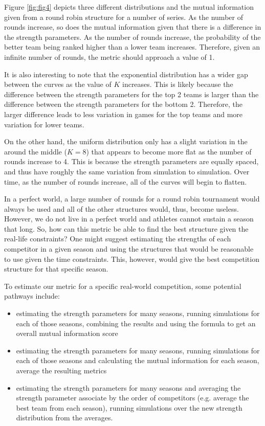 \documentclass[
  12pt,
]{article}
\begin{document}
Figure \ref{fig:fig4} depicts three different distributions and the
mutual information given from a round robin structure for a number of
series. As the number of rounds increase, so does the mutual information
given that there is a difference in the strength parameters. As the
number of rounds increase, the probability of the better team being
ranked higher than a lower team increases. Therefore, given an infinite
number of rounds, the metric should approach a value of 1.

It is also interesting to note that the exponential distribution has a
wider gap between the curves as the value of \(K\) increases. This is
likely because the difference between the strength parameters for the
top 2 teams is larger than the difference between the strength
parameters for the bottom 2. Therefore, the larger difference leads to
less variation in games for the top teams and more variation for lower
teams.

On the other hand, the uniform distribution only has a slight variation
in the around the middle (\(K = 8\)) that appears to become more flat as
the number of rounds increase to 4. This is because the strength
parameters are equally spaced, and thus have roughly the same variation
from simulation to simulation. Over time, as the number of rounds
increase, all of the curves will begin to flatten.

In a perfect world, a large number of rounds for a round robin
tournament would always be used and all of the other structures would,
thus, become useless. However, we do not live in a perfect world and
athletes cannot sustain a season that long. So, how can this metric be
able to find the best structure given the real-life constraints? One
might suggest estimating the strengths of each competitor in a given
season and using the structures that would be reasonable to use given
the time constraints. This, however, would give the best competition
structure for that specific season.

To estimate our metric for a specific real-world competition, some
potential pathways include:

\begin{itemize}
\item
  estimating the strength parameters for many seasons, running
  simulations for each of those seasons, combining the results and using
  the formula to get an overall mutual information score
\item
  estimating the strength parameters for many seasons, running
  simulations for each of those seasons and calculating the mutual
  information for each season, average the resulting metrics
\item
  estimating the strength parameters for many seasons and averaging the
  strength parameter associate by the order of competitors (e.g. average
  the best team from each season), running simulations over the new
  strength distribution from the averages.
\end{itemize}
\end{document}

